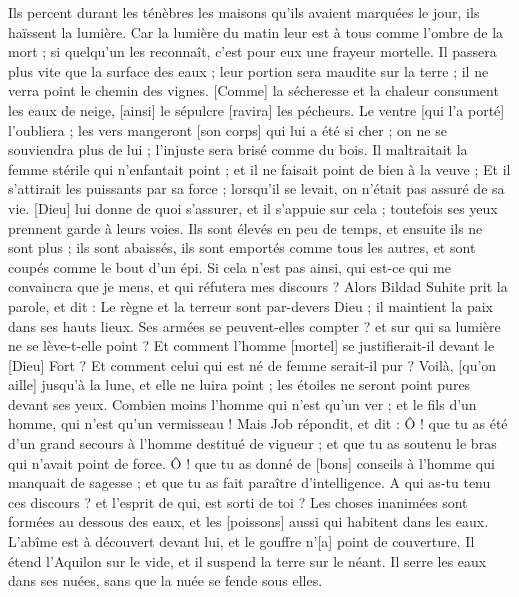 \begin{multicols}{2}
Ils percent durant les ténèbres les maisons qu'ils avaient marquées le jour, ils haïssent la lumière.
Car la lumière du matin leur est à tous comme l'ombre de la mort ; si quelqu'un les reconnaît, c'est pour eux une frayeur mortelle.
Il passera plus vite que la surface des eaux ; leur portion sera maudite sur la terre ; il ne verra point le chemin des vignes.
[Comme] la sécheresse et la chaleur consument les eaux de neige, [ainsi] le sépulcre [ravira] les pécheurs.
Le ventre [qui l'a porté] l'oubliera ; les vers mangeront [son corps] qui lui a été si cher ; on ne se souviendra plus de lui ; l'injuste sera brisé comme du bois.
Il maltraitait la femme stérile qui n'enfantait point ; et il ne faisait point de bien à la veuve ;
Et il s'attirait les puissants par sa force ; lorsqu'il se levait, on n'était pas assuré de sa vie.
[Dieu] lui donne de quoi s'assurer, et il s'appuie sur cela ; toutefois ses yeux prennent garde à leurs voies.
Ils sont élevés en peu de temps, et ensuite ils ne sont plus ; ils sont abaissés, ils sont emportés comme tous les autres, et sont coupés comme le bout d'un épi.
Si cela n'est pas ainsi, qui est-ce qui me convaincra que je mens, et qui réfutera mes discours ?
\VerseOne{}Alors Bildad Suhite prit la parole, et dit :
Le règne et la terreur sont par-devers Dieu ; il maintient la paix dans ses hauts lieux.
Ses armées se peuvent-elles compter ? et sur qui sa lumière ne se lève-t-elle point ?
Et comment l'homme [mortel] se justifierait-il devant le [Dieu] Fort ? Et comment celui qui est né de femme serait-il pur ?
Voilà, [qu'on aille] jusqu'à la lune, et elle ne luira point ; les étoiles ne seront point pures devant ses yeux.
Combien moins l'homme qui n'est qu'un ver ; et le fils d'un homme, qui n'est qu'un vermisseau !
\VerseOne{}Mais Job répondit, et dit :
Ô ! que tu as été d'un grand secours à l'homme destitué de vigueur ; et que tu as soutenu le bras qui n'avait point de force.
Ô ! que tu as donné de [bons] conseils à l'homme qui manquait de sagesse ; et que tu as fait paraître d'intelligence.
A qui as-tu tenu ces discours ? et l'esprit de qui, est sorti de toi ?
Les choses inanimées sont formées au dessous des eaux, et les [poissons] aussi qui habitent dans les eaux.
L'abîme est à découvert devant lui, et le gouffre n'[a] point de couverture.
Il étend l'Aquilon sur le vide, et il suspend la terre sur le néant.
Il serre les eaux dans ses nuées, sans que la nuée se fende sous elles.

\end{multicols}
